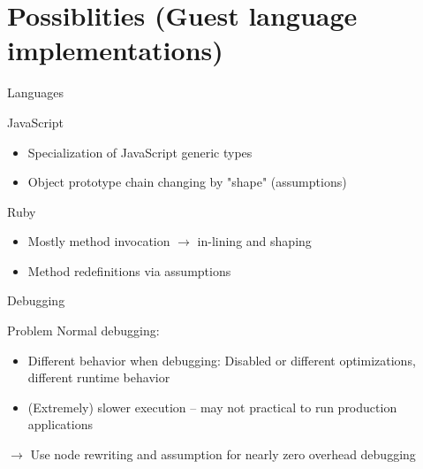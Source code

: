 \documentclass[xcolor=dvipsname]{beamer}
\newcommand{\idea}[1]{$\rightarrow$ #1}
\begin{document}
\section{Possiblities (Guest language implementations)}

\begin{frame}{Languages}
  \begin{block}{JavaScript}
    \begin{itemize}
      \item Specialization of JavaScript generic types
      \item Object prototype chain changing by "shape" (assumptions)
    \end{itemize}
  \end{block}
  \begin{block}{Ruby}
    \begin{itemize}
      \item Mostly method invocation $\rightarrow$ in-lining and shaping
      \item Method redefinitions via assumptions
    \end{itemize}
  \end{block}
\end{frame}

\begin{frame}{Debugging}
  \begin{alertblock}{Problem}
  Normal debugging:
    \begin{itemize}
      \item Different behavior when debugging: Disabled or different optimizations, different runtime behavior
      \item (Extremely) slower execution -- may not practical to run production applications
    \end{itemize}
  \end{alertblock}

  \idea{Use node rewriting and assumption for nearly zero overhead debugging}
\end{frame}
\end{document}
